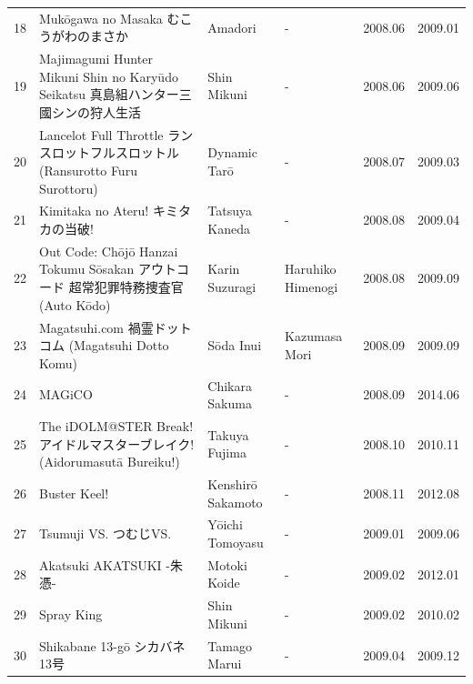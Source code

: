\documentclass{article}
\begin{document}
\begin{tabular}{llllll}
18 & Mukōgawa no Masaka むこうがわのまさか & Amadori & - & 2008.06 & 2009.01 \\
19 & Majimagumi Hunter Mikuni Shin no Karyūdo Seikatsu 真島組ハンター三國シンの狩人生活 & Shin Mikuni & - & 2008.06 & 2009.06 \\
20 & Lancelot Full Throttle ランスロットフルスロットル (Ransurotto Furu Surottoru) & Dynamic Tarō & - & 2008.07 & 2009.03 \\
21 & Kimitaka no Ateru! キミタカの当破! & Tatsuya Kaneda & - & 2008.08 & 2009.04 \\
22 & Out Code: Chōjō Hanzai Tokumu Sōsakan アウトコード 超常犯罪特務捜査官 (Auto Kōdo) & Karin Suzuragi & Haruhiko Himenogi & 2008.08 & 2009.09 \\
23 & Magatsuhi.com 禍霊ドットコム (Magatsuhi Dotto Komu) & Sōda Inui & Kazumasa Mori & 2008.09 & 2009.09 \\
24 & MAGiCO & Chikara Sakuma & - & 2008.09 & 2014.06 \\
25 & The iDOLM@STER Break! アイドルマスターブレイク! (Aidorumasutā Bureiku!) & Takuya Fujima & - & 2008.10 & 2010.11 \\
26 & Buster Keel! & Kenshirō Sakamoto & - & 2008.11 & 2012.08 \\
27 & Tsumuji VS. つむじVS. & Yōichi Tomoyasu & - & 2009.01 & 2009.06 \\
28 & Akatsuki AKATSUKI -朱憑- & Motoki Koide & - & 2009.02 & 2012.01 \\
29 & Spray King & Shin Mikuni & - & 2009.02 & 2010.02 \\
30 & Shikabane 13-gō シカバネ13号 & Tamago Marui & - & 2009.04 & 2009.12 \\
\bottomrule
\end{tabular}
\end{document}
